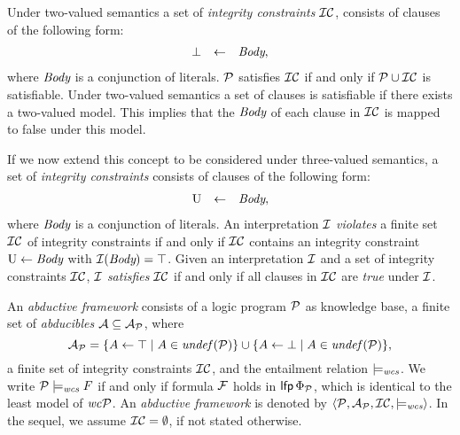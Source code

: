 \begin{definition}
\normalfont
Under two-valued semantics a set of \textit{integrity constraints} ${\cal IC}$, consists of clauses of the following form:
\[
\begin{array}{lcl}
\bot &\leftarrow& \mbox{\em Body},
\end{array}
\]
where $\mbox{\em Body}$ is a conjunction of literals. $\mathcal{P}$ satisfies ${\cal IC}$ if and only if $\mathcal{P} \cup {\cal IC}$ is satisfiable. Under two-valued semantics a set of clauses is satisfiable if there exists a two-valued model. This implies that the $\mbox{\em Body}$ of each clause in ${\cal IC}$ is mapped to false under this model.

If we now extend this concept to be considered under three-valued semantics, a set of \textit{integrity constraints} consists of clauses of the following form:
\[
\begin{array}{lcl}
\mbox{\normalfont U} &\leftarrow& \mbox{\em Body},
\end{array}
\]
where $\mbox{\em Body}$ is a conjunction of literals. An interpretation $\mathcal{I}$ \textit{violates} a finite set ${\cal IC}$ of integrity constraints if and only if ${\cal IC}$ contains an integrity constraint $\mbox{\normalfont U} \leftarrow \mbox{\em Body}$ with $\mathcal{I}(\mbox{\em Body}) = \top$. Given an interpretation $\mathcal{I}$ and a set of integrity constraints ${\cal IC}$, $\mathcal{I}$ \textit{satisfies} ${\cal IC}$ if and only if all clauses in ${\cal IC}$ are \textit{true} under $\mathcal{I}$.

\end{definition}
\bigskip
\begin{definition}
\normalfont
An \textit{abductive framework} consists of a logic program $\mathcal{P}$ as knowledge base, a finite set of \textit{abducibles} $\mathcal{A} \subseteq \mathcal{A}_{\mathcal{P}}$, where
\[
\mathcal{A}_{\mathcal{P}} =  \{ A \leftarrow \top \mid A \in \mathit{undef}(\mathcal{P})\} \cup \{A \leftarrow \bot \mid A \in \mathit{undef}(\mathcal{P})\},
\]
a finite set of integrity constraints ${\cal IC}$, and the entailment relation $\models_{\normalfont\textit{wcs}}$. We write $\mathcal{P} \models_{\normalfont\textit{wcs}} F$ if and only if formula $\mathcal{F}$ holds in $\mathsf{lfp}\, \Phi_{\mathcal{P}}$, which is identical to the least model of $\mathit{wc} \mathcal{P}$. An \textit{abductive framework} is denoted by $\langle \mathcal{P}, \mathcal{A}_{\mathcal{P}}, {\cal IC}, \models_{\normalfont\textit{wcs}}\rangle$. In the sequel, we assume ${\cal IC} = \emptyset$, if not stated otherwise.
\end{definition}


